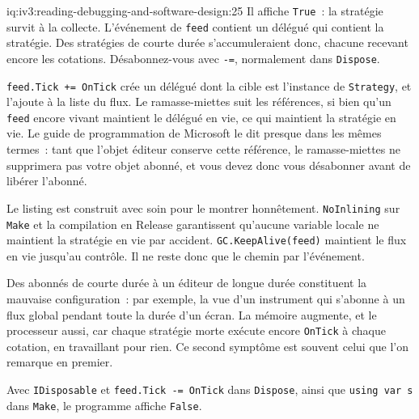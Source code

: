 \begin{solution}{iq:iv3:reading-debugging-and-software-design:25}
Il affiche \texttt{True}~: la stratégie survit à la collecte. L'événement de \texttt{feed} contient un délégué qui contient la stratégie. Des stratégies de courte durée s'accumuleraient donc, chacune recevant encore les cotations. Désabonnez-vous avec \texttt{-=}, normalement dans \texttt{Dispose}.

\texttt{feed.Tick += OnTick} crée un délégué dont la cible est l'instance de \texttt{Strategy}, et l'ajoute à la liste du flux. Le ramasse-miettes suit les références, si bien qu'un \texttt{feed} encore vivant maintient le délégué en vie, ce qui maintient la stratégie en vie. Le guide de programmation de Microsoft le dit presque dans les mêmes termes~: tant que l'objet éditeur conserve cette référence, le ramasse-miettes ne supprimera pas votre objet abonné, et vous devez donc vous désabonner avant de libérer l'abonné.

Le listing est construit avec soin pour le montrer honnêtement. \texttt{NoInlining} sur \texttt{Make} et la compilation en Release garantissent qu'aucune variable locale ne maintient la stratégie en vie par accident. \texttt{GC.KeepAlive(feed)} maintient le flux en vie jusqu'au contrôle. Il ne reste donc que le chemin par l'événement.

Des abonnés de courte durée à un éditeur de longue durée constituent la mauvaise configuration~: par exemple, la vue d'un instrument qui s'abonne à un flux global pendant toute la durée d'un écran. La mémoire augmente, et le processeur aussi, car chaque stratégie morte exécute encore \texttt{OnTick} à chaque cotation, en travaillant pour rien. Ce second symptôme est souvent celui que l'on remarque en premier.

Avec \texttt{IDisposable} et \texttt{feed.Tick -= OnTick} dans \texttt{Dispose}, ainsi que \texttt{using var s} dans \texttt{Make}, le programme affiche \texttt{False}.



\end{solution}

